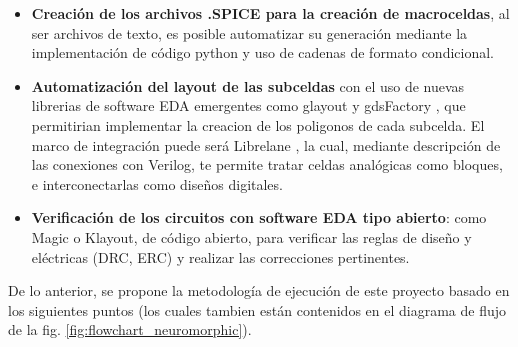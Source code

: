\documentclass[letter, 12pt]{article}
\begin{document}
\begin{itemize}
    \item \textbf{Creación de los archivos .SPICE para la creación de macroceldas}, al ser archivos de texto, es posible automatizar su generación mediante la implementación de código python y uso de cadenas de formato condicional. 
    \item \textbf{Automatización del layout de las subceldas} con el uso de nuevas librerias de software EDA emergentes como glayout y gdsFactory \cite{Hammoud2024, LinanCembrano2024, GDSFactoryWebsite}, que permitirian implementar la creacion de los poligonos de cada subcelda. El marco de integración puede será Librelane \cite{librelane}, la cual, mediante descripción de las conexiones con Verilog, te permite tratar celdas analógicas como bloques, e interconectarlas como diseños digitales. 
    \item \textbf{Verificación de los circuitos con software EDA tipo abierto}: como Magic o Klayout, de código abierto, para verificar las reglas de diseño y eléctricas (DRC, ERC) y realizar las correcciones pertinentes. 
\end{itemize}

De lo anterior, se propone la metodología de ejecución de este proyecto basado en los siguientes puntos (los cuales tambien están contenidos en el diagrama de flujo de la fig. \ref{fig:flowchart_neuromorphic}).
\end{document}
